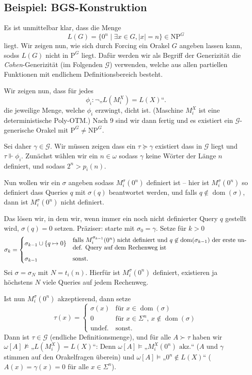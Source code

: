 \documentclass[nofonts]{uebung}
\def\P{\ensuremath{\mathrm{P}}}
\def\NP{\ensuremath{\mathrm{NP}}}
\DeclareMathOperator{\dom}{dom}
\begin{document}


\subsection*{Beispiel: BGS-Konstruktion}

Es ist unmittelbar klar, dass die Menge
\[ L(G) = \{ 0^n \mid \exists x\in G, |x|=n \} \in \NP^G \]
liegt.
Wir zeigen nun, wie sich durch Forcing ein Orakel $G$ angeben lassen kann, sodss $L(G)$ nicht in $\P^G$ liegt.
Dafür werden wir als Begriff der Generizität die \emph{Cohen}-Generizität (im Folgenden $\mathcal G$) verwenden, welche aus allen partiellen Funktionen mit endlichem Definitionsbereich besteht.

Wir zeigen nun, dass für jedes
\[ \phi_i \colon \neg„L(M^X_i)=L(X)“.  \] %
die jeweilige Menge, welche $\phi_i$ erzwingt, dicht ist. (Maschine $M_i^X$ ist eine deterministische Poly-OTM.) Nach 9 sind wir dann fertig und es existiert ein $\mathcal G$-generische Orakel mit $\P^G\neq \NP^G$.

Sei daher $\gamma\in\mathcal G$. Wir müssen zeigen dass ein $\tau\succeq \gamma$ existiert dass in $\mathcal G$ liegt und $\tau\Vdash \phi_i$. 
Zunächst wählen wir ein $n\in\omega$ sodass $\gamma$ keine Wörter der Länge $n$ definiert, und sodass $2^n>p_i(n)$.

Nun wollen wir ein $\sigma$ angeben sodass $M_i^\sigma(0^n)$ definiert ist -- hier ist $M_i^\sigma(0^n)$ so definiert dass Queries $q$ mit $\sigma(q)$ beantwortet werden, und falls $q\not\in\dom(\sigma)$, dann ist $M_i^\sigma(0^n)$ nicht definiert.

Das lösen wir, in dem wir, wenn immer ein noch nicht definierter Query $q$ gestellt wird, $\sigma(q)=0$ setzen. Präziser: starte mit $\sigma_0=\gamma$.
Setze für $k>0$
\[ \sigma_k = \begin{cases}
    \sigma_{k-1} \cup \{q\mapsto 0\} & \text{\parbox{28em}{falls $M_i^{\sigma_{k-1}}(0^n)$ nicht definiert und $q\not\in\dom(\sigma_{k-1})$ der erste undef. Query auf dem Rechenweg ist}}\\[1.0em]
    \sigma_{k-1} & \text{sonst}.
\end{cases}
\]
Sei $\sigma=\sigma_N$ mit $N=t_i(n)$. Hierfür ist $M_i^\sigma(0^n)$ definiert, existieren ja höchstens $N$ viele Queries auf jedem Rechenweg.

Ist nun $M_i^\sigma(0^n)$ akzeptierend, dann setze
\[ \tau(x) =\begin{cases} \sigma(x) & \text{für $x\in\dom(\sigma)$}\\0&\text{für $x\in\Sigma^n$, $x\not\in\dom(\sigma)$}\\\text{undef.} & \text{sonst}.\end{cases} \]
Dann ist $\tau\in\mathcal G$ (endliche Definitionsmenge), und für alle $A\succ \tau$ haben wir $\omega[A]\not\vDash \text{„$L(M_i^X)=L(X)$“}$:
Denn $\omega[A] \vDash „M_i^X(0^n)\text{ akz.}“$ ($A$ und $\gamma$ stimmen auf den Orakelfragen überein) und $\omega[A] \vDash „0^n\not\in L(X)“$ ($A(x)=\gamma(x)=0$ für alle $x\in\Sigma^n$).
\end{document}
